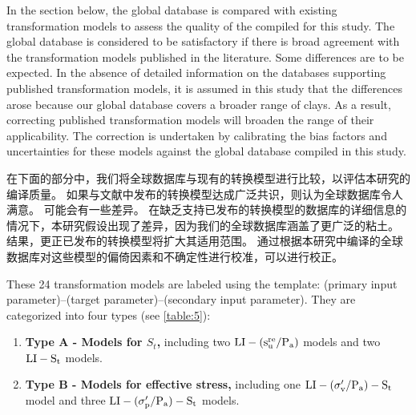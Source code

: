 \begin{paracol}{2}
    
    \switchcolumn*
        
    In the section below, the global database is compared with existing transformation models to assess the quality of the  compiled for this study. The global database is considered to be satisfactory if there is broad agreement with the transformation models published in the literature. Some differences are to be expected. In the absence of detailed information on the databases supporting published transformation models, it is assumed in this study that the differences arose because our global database covers a broader range of clays. As a result, correcting published transformation models will broaden the range of their applicability. The correction is undertaken by calibrating the bias factors and uncertainties for these models against the global database compiled in this study.
    
    \switchcolumn
        
    在下面的部分中，我们将全球数据库与现有的转换模型进行比较，以评估本研究的编译质量。 如果与文献中发布的转换模型达成广泛共识，则认为全球数据库令人满意。 可能会有一些差异。 在缺乏支持已发布的转换模型的数据库的详细信息的情况下，本研究假设出现了差异，因为我们的全球数据库涵盖了更广泛的粘土。 结果，更正已发布的转换模型将扩大其适用范围。 通过根据本研究中编译的全球数据库对这些模型的偏倚因素和不确定性进行校准，可以进行校正。
    
    \switchcolumn*
        
    These 24 transformation models are labeled using the template: (primary input parameter)–(target parameter)–(secondary input parameter). They are categorized into four types (see \autoref{table:5}):
    \begin{enumerate}
        \item \textbf{Type A - Models for $S_t$,} including two $\rm{LI}-(s_u^{re}/P_a)$ models and two $\rm{LI}-S_t$ models.
        
        \item \textbf{Type B - Models for effective stress,} including one $\rm{LI}-(\sigma_v'/P_a)-S_t$ model and three $\rm{LI}-(\sigma_p'/P_a)-S_t$ models.
        

\end{enumerate}
\end{paracol}
